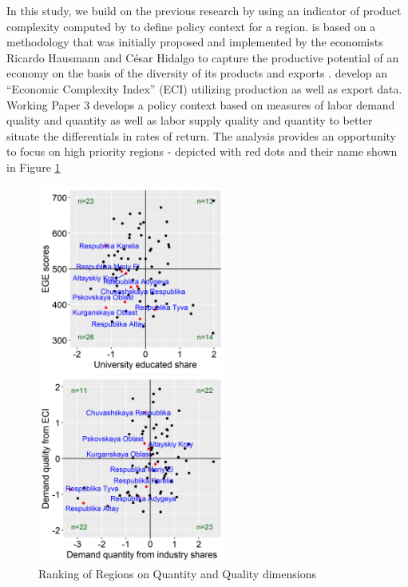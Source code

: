 \documentclass[alpha-refs]{wiley-article-04t}
\begin{document}
In this study, we build on the previous research by using an indicator of 
product complexity computed by \cite{lyubimov2018} to define policy context 
for a region. \cite{lyubimov2018} is based on 
a methodology that was initially proposed and implemented by the economists 
Ricardo Hausmann and C\'esar Hidalgo to capture the productive potential 
of an economy on the basis of the diversity of its products and exports 
\parencite{hausmann2011, hausmann2014}. \cite{lyubimov2018} develop an 
``Economic Complexity Index'' (ECI) utilizing production as well as export 
data. Working Paper 3 develops a policy context based on measures of labor 
demand quality and quantity as well as labor supply quality and quantity to 
better situate the differentials in rates of return. The analysis provides 
an opportunity to focus on high priority regions - depicted with red dots 
and their name shown in Figure \ref{fig:4.2}

\setcounter{table}{0}


\begin{figure}[htbp!]
	\begin{minipage}[b]{.5\linewidth}
		\centering
		\includegraphics[width=175pt]{ranks1a.png}
	\end{minipage}
	\hfill
	\begin{minipage}[b]{.5\linewidth}
		\centering
		\includegraphics[width=175pt]{ranks1b.png}
	\end{minipage}
	\caption{Ranking of Regions on Quantity and Quality 
	dimensions}\label{fig:4.2}
\end{figure}
\end{document}
